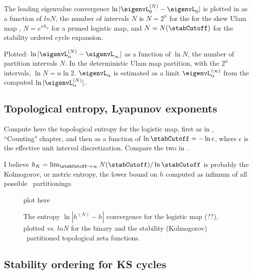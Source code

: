 The leading eigenvalue convergence
$\ln |\eigenvL_0^{(N)} - \eigenvL_0|$ is plotted in
 as a function of
$ln N$,
the number of intervals $N$ is $N = 2^{n}$
for the for the skew Ulam map ,
$N =e^{n h_n}$ for a pruned logistic map, and $N = N(\stabCutoff)$
for the stability ordered cycle expansion.

Plotted:
$\ln |\eigenvL_\alpha^{(N)}-\eigenvL_\infty|$
as a function of $\ln N$,
the number of partition intervals $N$.
In the deterministic
Ulam map partition, with the $2^n$ intervals,
$\ln N= n \ln 2$.
$\eigenvL_\alpha$ is estimated as a limit
$\eigenvL_\alpha^{(\infty)}$ from the computed
$\ln |\eigenvL_\alpha^{(N)}|$.



\subsection{Topological entropy, Lyapunov exponents}
\label{s-StOrdKS}

Compute here the topological entropy for the logistic map, first
as in \wwwcb, ``Counting" chapter, and then as a function of
$\ln \stabCutoff = - \ln \epsilon$, where $ \epsilon$ is the
effective unit interval discretization.
Compare the two in
.

I believe
$h_K = \lim_{{\stabCutoff} \to \infty} N(\stabCutoff)/\ln \stabCutoff$
is probably the Kolmogorov, or metric entropy, the lower bound on
$h$ computed as infimum of all possible \statesp\ partitionings.


\begin{figure}\label{fig:EntrStabOrder1}
\begin{center}
plot here %
\end{center}
\caption[Entropy convergence for the logistic map]{
The entropy $\ln | h^{(N)} - h|$
convergence for the
logistic map (??), plotted {\em vs.} $ln N$
for the binary and the stability (Kolmogorov) \statesp\ partitioned
topological zeta functions.
        }
\end{figure}



\subsection{Stability ordering for KS cycles}
\label{s-StOrdKS}

